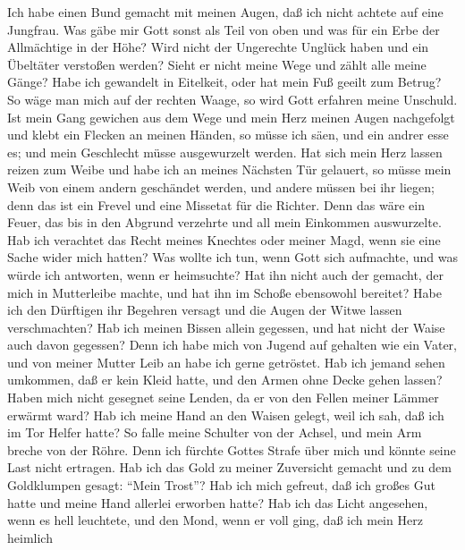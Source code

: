  Ich habe einen Bund gemacht mit meinen Augen, daß ich nicht
achtete auf eine Jungfrau.  Was gäbe mir Gott sonst als Teil
von oben und was für ein Erbe der Allmächtige in der Höhe? 
Wird nicht der Ungerechte Unglück haben und ein Übeltäter verstoßen
werden?  Sieht er nicht meine Wege und zählt alle meine
Gänge?  Habe ich gewandelt in Eitelkeit, oder hat mein Fuß
geeilt zum Betrug?  So wäge man mich auf der rechten Waage,
so wird Gott erfahren meine Unschuld.  Ist mein Gang
gewichen aus dem Wege und mein Herz meinen Augen nachgefolgt und klebt
ein Flecken an meinen Händen,  so müsse ich säen, und ein
andrer esse es; und mein Geschlecht müsse ausgewurzelt werden.
 Hat sich mein Herz lassen reizen zum Weibe und habe ich an
meines Nächsten Tür gelauert,  so müsse mein Weib von einem
andern geschändet werden, und andere müssen bei ihr liegen;
 denn das ist ein Frevel und eine Missetat für die Richter.
 Denn das wäre ein Feuer, das bis in den Abgrund verzehrte
und all mein Einkommen auswurzelte.  Hab ich verachtet das
Recht meines Knechtes oder meiner Magd, wenn sie eine Sache wider mich
hatten?  Was wollte ich tun, wenn Gott sich aufmachte, und
was würde ich antworten, wenn er heimsuchte?  Hat ihn nicht
auch der gemacht, der mich in Mutterleibe machte, und hat ihn im Schoße
ebensowohl bereitet?  Habe ich den Dürftigen ihr Begehren
versagt und die Augen der Witwe lassen verschmachten?  Hab
ich meinen Bissen allein gegessen, und hat nicht der Waise auch davon
gegessen?  Denn ich habe mich von Jugend auf gehalten wie
ein Vater, und von meiner Mutter Leib an habe ich gerne getröstet.
 Hab ich jemand sehen umkommen, daß er kein Kleid hatte,
und den Armen ohne Decke gehen lassen?  Haben mich nicht
gesegnet seine Lenden, da er von den Fellen meiner Lämmer erwärmt ward?
 Hab ich meine Hand an den Waisen gelegt, weil ich sah, daß
ich im Tor Helfer hatte?  So falle meine Schulter von der
Achsel, und mein Arm breche von der Röhre.  Denn ich
fürchte Gottes Strafe über mich und könnte seine Last nicht ertragen.
 Hab ich das Gold zu meiner Zuversicht gemacht und zu dem
Goldklumpen gesagt: ``Mein Trost''?  Hab ich mich gefreut,
daß ich großes Gut hatte und meine Hand allerlei erworben hatte?
 Hab ich das Licht angesehen, wenn es hell leuchtete, und
den Mond, wenn er voll ging,  daß ich mein Herz heimlich
